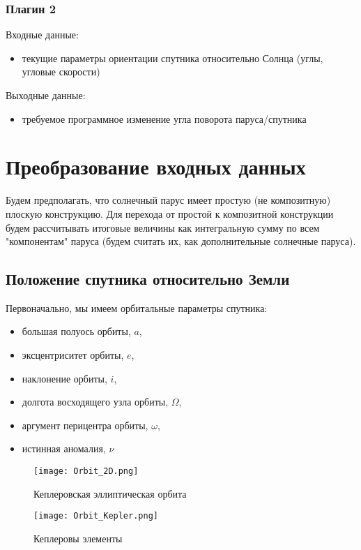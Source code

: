 \documentclass[tikz, a4paper,12pt]{extreport}
\begin{document}
    \subsection{Плагин 2}\par
    \noindent\indent Входные данные:
    \begin{itemize}
      \item текущие параметры ориентации спутника относительно Солнца (углы,
      угловые скорости)
    \end{itemize}\par
    Выходные данные:
    \begin{itemize}
      \item требуемое программное изменение угла поворота паруса/спутника
    \end{itemize}
  \chapter{Преобразование входных данных}\par
  \noindent\indent Будем предполагать, что солнечный парус имеет простую (не композитную) плоскую конструкцию.
  Для перехода от простой к композитной конструкции будем рассчитывать итоговые величины
  как интегральную сумму по всем "компонентам" паруса (будем считать их, как дополнительные солнечные паруса).
  \section{Положение спутника относительно Земли}
  \noindent\indent Первоначально, мы имеем орбитальные параметры спутника:
  \begin{itemize}
    \item большая полуось орбиты, $a$,
    \item эксцентриситет орбиты, $e$,
    \item наклонение орбиты, $i$,
    \item долгота восходящего узла орбиты, $\Omega$,
    \item аргумент перицентра орбиты, $\omega$,
    \item истинная аномалия, $\nu$
  \end{itemize}
  \setlength\intextsep{0pt}
  \begin{figure}[h]
    \centering
    \begin{minipage}[t]{0.35\textwidth}
      \texttt{[image: Orbit\_2D.png]}
      \caption{Кеплеровская эллиптическая орбита}
      \label{fig:KeplerOrbit2D}
    \end{minipage}
    \hspace{2 cm}
    \begin{minipage}[t]{0.35\textwidth}
      \texttt{[image: Orbit\_Kepler.png]}
      \caption{Кеплеровы элементы}
      \label{fig:KeplerOrbitParameters}
    \end{minipage}
  \end{figure}
  \setlength\intextsep{0pt}
\end{document}
